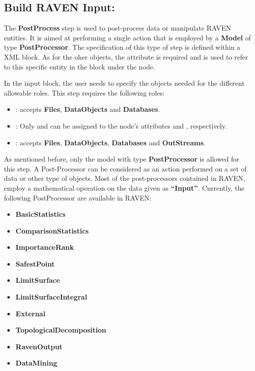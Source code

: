 \subsection{Build RAVEN Input: }
\label{sub:ravenPostProcess}
The \textbf{PostProcess} step is used to post-process data or manipulate RAVEN entities. It is aimed at performing
a single action that is employed by a \textbf{Model} of type \textbf{PostProcessor}. The specification of this
type of step is defined within a  XML block. As for the oher objects, the attribute 
 is required and is used to refer to this specific entity in the  block under
the  node.

In the  input block, the user needs to specify the objects needed for the different allowable
roles. This step requires the following roles:

\begin{itemize}
  \item {}: accepts \textbf{Files}, \textbf{DataObjects} and \textbf{Databases}.
  \item {}: Only  and  can be assigned to the node's
    attributes  and , respectively.
  \item {}: accepts \textbf{Files}, \textbf{DataObjects}, \textbf{Databases} and \textbf{OutStreams}.
\end{itemize}

As mentioned before, only the model with type \textbf{PostProcessor} is allowed for this step. A Post-Processor
can be considered as an action performed on a set of data or other type of objects. Most of the post-processors
contained in RAVEN, employ a mathematical operation on the data given as \textbf{``Input''}. Currently, the
following PostProcessor are available in RAVEN:

\begin{itemize}
  \itemsep0em
  \item \textbf{BasicStatistics}
  \item \textbf{ComparisonStatistics}
  \item \textbf{ImportanceRank}
  \item \textbf{SafestPoint}
  \item \textbf{LimitSurface}
  \item \textbf{LimitSurfaceIntegral}
  \item \textbf{External}
  \item \textbf{TopologicalDecomposition}
  \item \textbf{RavenOutput}
  \item \textbf{DataMining}
\end{itemize}

